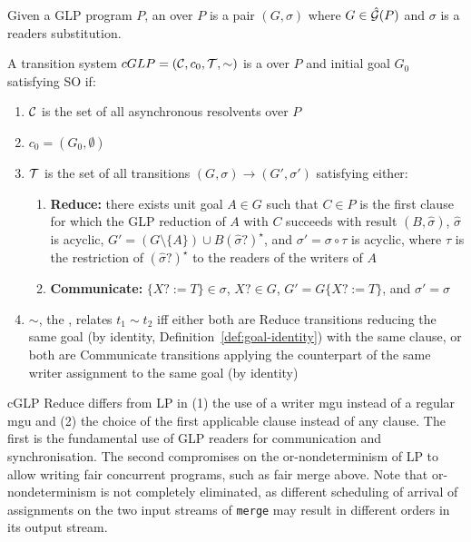 \begin{definition}
\label{def:cglp-ts}
Given a GLP program $P$, an  over $P$ is a pair $(G, \sigma)$ where $G \in \hat{\mathcal{G}}(P)$ and $\sigma$ is a readers substitution.

A transition system $cGLP = (\mathcal{C}, c_0, \mathcal{T}, {\sim})$ is a  over $P$ and initial goal $G_0$ satisfying SO if:
\begin{enumerate}
    \item $\mathcal{C}$ is the set of all asynchronous resolvents over $P$
    \item $c_0 = (G_0, \emptyset)$
    \item $\mathcal{T}$ is the set of all transitions $(G, \sigma) \rightarrow (G', \sigma')$ satisfying either:
    \begin{enumerate}
        \item \textbf{Reduce:} there exists unit goal $A \in G$ such that $C \in P$ is the first clause for which the GLP reduction of $A$ with $C$ succeeds with result $(B, \hat\sigma)$, $\hat\sigma$ is acyclic, $G' = (G \setminus \{A\}) \cup B(\hat\sigma?)^\star$, and $\sigma' = \sigma \circ \tau$ is acyclic, where $\tau$ is the restriction of $(\hat\sigma?)^\star$ to the readers of the writers of $A$
        \item \textbf{Communicate:} $\{X? := T\} \in \sigma$, $X?\in G$, $G' = G\{X? := T\}$, and $\sigma' = \sigma$
    \end{enumerate}
    \item ${\sim}$, the , relates $t_1 \sim t_2$ iff either both are Reduce transitions reducing the same goal (by identity, Definition~\ref{def:goal-identity}) with the same clause, or both are Communicate transitions applying the counterpart of the same writer assignment to the same goal (by identity)
\end{enumerate}
\end{definition}

cGLP Reduce differs from LP in (1) the use of a writer mgu instead of a regular mgu and (2) the choice of the first applicable clause instead of any clause. The first is the fundamental use of GLP readers for communication and synchronisation. The second compromises on the or-nondeterminism of LP to allow writing fair concurrent programs, such as fair merge above. Note that or-nondeterminism is not completely eliminated, as different scheduling of arrival of assignments on the two input streams of \verb|merge| may result in different orders in its output stream.

